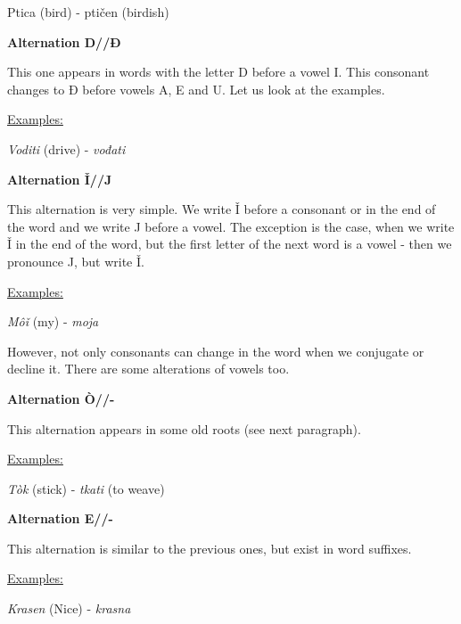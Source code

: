 Ptica (bird) \textipa{[’pti\t{ts}a]} - ptičen (birdish) \textipa{[’pti\t{tS}en]}


\textbf{Alternation D//Đ}

This one appears in words with the letter D before a vowel I. This consonant changes to Đ before vowels A, E and U. Let us look at the examples.

\underline{Examples:}

\textit{Voditi} (drive) \textipa{[‘vodit1]} - \textit{vođati} 

\textbf{Alternation Ǐ//J}

This alternation is very simple. We write Ǐ before a consonant or in the end of the word and we write J before a vowel. The exception is the case, when we write Ǐ in the end of the word, but the first letter of the next word is a vowel - then we pronounce J, but write Ǐ.

\underline{Examples:}

\textit{Môǐ} (my) \textipa{[mUj]} - \textit{moja} \textipa{[m2'Ja]}

However, not only consonants can change in the word when we conjugate or decline it. There are some alterations of vowels too.

\textbf{Alternation Ò//-}

This alternation appears in some old roots (see next paragraph).

\underline{Examples:}

\textit{Tòk} (stick) \textipa{[t@k]} - \textit{tkati} \textipa{['tkatI]} (to weave)


\textbf{Alternation E//-}

This alternation is similar to the previous ones, but exist in word suffixes.

\underline{Examples:}

\textit{Krasen} (Nice) \textipa{['kras@n]} - \textit{krasna} \textipa{['krasna]}






